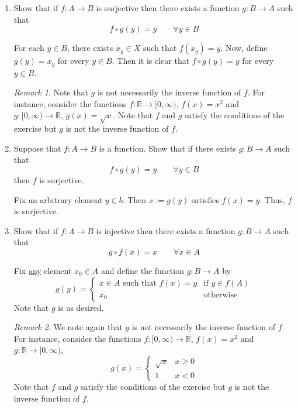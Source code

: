 \documentclass[12pt, reqno]{article}
\numberwithin{equation}{section}
\theoremstyle{definition}
\theoremstyle{remark}
\newtheorem{rem}{Remark}
\newcommand{\RR}{\mathbb{R}}
\begin{document}
\begin{enumerate}[leftmargin=*]
	\item Show that if $f:A\to B$ is surjective then there exists a function $g:B\to A$ such that
	      \[
		      f\circ g(y) = y \qquad \forall y\in B
	      \]

	      For each $y\in B$, there exists $x_y\in X$ such that $f(x_y) = y$. Now, define $g(y) = x_y$ for every $y\in B$. Then it is clear that $f\circ g(y) = y$ for every $y\in B$.

	      \begin{rem}
		      Note that $g$ is not necessarily the inverse function of $f$. For instance, consider the functions $f: \RR\to[0,\infty), \, f(x) = x^2$ and $g:[0, \infty) \to \RR,\, g(x) = \sqrt{x}$. Note that $f$ and $g$ satisfy the conditions of the exercise but $g$ is not the inverse function of $f$.
	      \end{rem}

	\item Suppose that $f:A\to B$ is a function. Show that if there exists $g:B\to A$ such that
	      \[
		      f\circ g(y) = y \qquad \forall y\in B
	      \]
	      then $f$ is surjective.

	      Fix an arbitrary element $y\in b$. Then $x:= g(y)$ satisfies $f(x) = y$. Thus, $f$ is surjective.

	\item Show that if $f:A\to B$ is injective then there exists a function $g:B\to A$ such that
	      \[
		      g\circ f(x) = x \qquad \forall x\in A
	      \]

	      Fix \underline{any} element $x_0\in A$ and define the function $g : B\to A$ by
	      \[
		      g(y) = \begin{cases}
			      x\in A \text{ such that } f(x) = y & \text{if }y\in f(A) \\
			      x_0                                & \text{otherwise}
		      \end{cases}
	      \]
	      Note that $g$ is as desired.

	      \begin{rem}
		      We note again that $g$ is not necessarily the inverse function of $f$. For instance, consider the functions $f: [0, \infty)\to \RR, \, f(x) = x^2$ and $g:\RR \to [0, \infty)$,
		      \[
			      g(x) = \begin{cases}
				      \sqrt{x} & x\geq 0 \\
				      1        & x<0
			      \end{cases}
		      \]
		      Note that $f$ and $g$ satisfy the conditions of the exercise but $g$ is not the inverse function of $f$.
	      \end{rem}


\end{enumerate}
\end{document}
